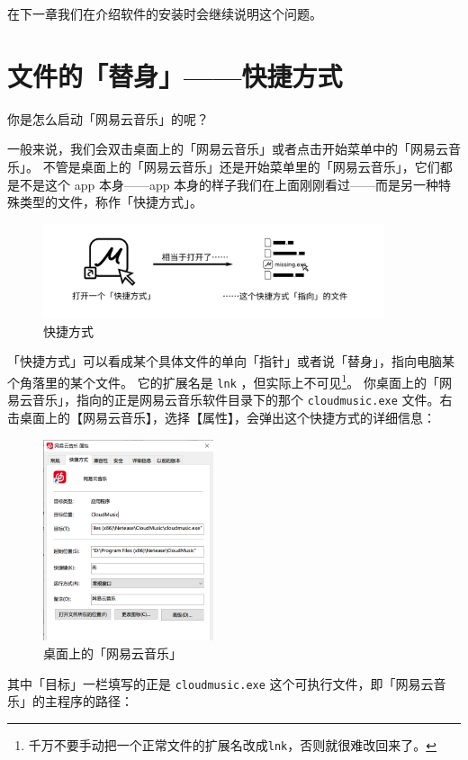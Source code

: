 在下一章我们在介绍软件的安装时会继续说明这个问题。

\section{文件的「替身」——快捷方式}

你是怎么启动「网易云音乐」的呢？

一般来说，我们会双击桌面上的「网易云音乐」或者点击开始菜单中的「网易云音乐」。
不管是桌面上的「网易云音乐」还是开始菜单里的「网易云音乐」，它们都是不是这个 app 本身——app 本身的样子我们在上面刚刚看过——而是另一种特殊类型的文件，称作「快捷方式」。

\begin{figure}[htb!]
  \centering
  \includegraphics[width=10cm]{assets/Shortcut.png}
  \caption{快捷方式}
  \label{Shortcut}
\end{figure}

「快捷方式」可以看成某个具体文件的单向「指针」或者说「替身」，指向电脑某个角落里的某个文件。
它的扩展名是 \verb|lnk| ，但实际上不可见\footnote{千万不要手动把一个正常文件的扩展名改成\texttt{lnk}，否则就很难改回来了。}。
你桌面上的「网易云音乐」，指向的正是网易云音乐软件目录下的那个 \verb|cloudmusic.exe| 文件。右击桌面上的【网易云音乐】，选择【属性】，会弹出这个快捷方式的详细信息：

\begin{figure}
  \centering
  \includegraphics[width=5cm]{assets/NetEase_Music_Link.png}
  \caption{桌面上的「网易云音乐」}
  \label{NetEase_Music_Link}
\end{figure}

其中「目标」一栏填写的正是 \verb|cloudmusic.exe| 这个可执行文件，即「网易云音乐」的主程序的路径：


